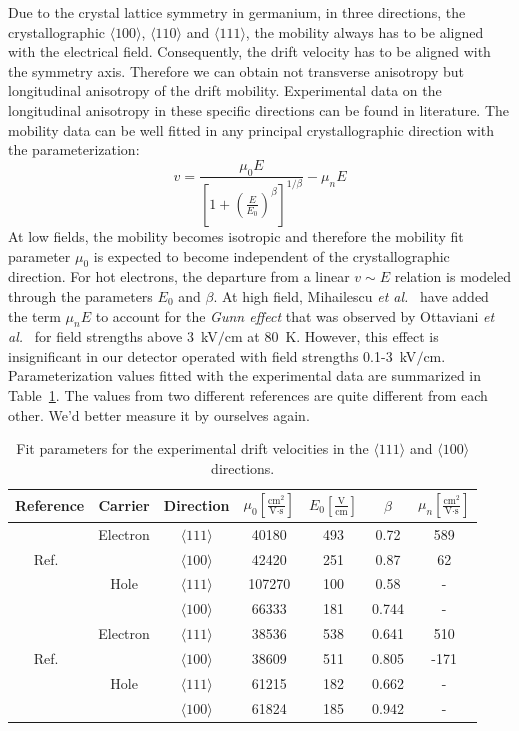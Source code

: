 Due to the crystal lattice symmetry in germanium, in three directions, the crystallographic $\langle100\rangle$, $\langle110\rangle$ and $\langle111\rangle$, the mobility always has to be aligned with the electrical field. Consequently, the drift velocity has to be aligned with the symmetry axis. Therefore we can obtain not transverse anisotropy but longitudinal anisotropy of the drift mobility. Experimental data on the longitudinal anisotropy in these specific directions can be found in literature. The mobility data can be well fitted in any principal crystallographic direction with the parameterization:
\begin{equation}
  \label{eq:para}
  v = \frac{\mu_{0}E}{[1+(\frac{E}{E_{0}})^{\beta}]^{1/\beta}} -   \mu_{n}E
\end{equation}
At low fields, the mobility becomes isotropic and therefore the mobility fit parameter $\mu_{0}$ is expected to become independent of the crystallographic direction. For hot electrons, the departure from a linear $v \sim E$ relation is modeled through the parameters $E_{0}$ and $\beta$. At high field, Mihailescu \textit{et al.}~\cite{miha} have added the term $\mu_{n}E$ to account for the \emph{Gunn effect} that was observed by Ottaviani \textit{et al.}~\cite{otta} for field strengths above 3~kV$/$cm at 80~K. However, this effect is insignificant in our detector operated with field strengths 0.1-3~kV$/$cm. Parameterization values fitted with the experimental data are summarized in Table~\ref{tab:pars}. The values from two different references are quite different from each other. We'd better measure it by ourselves again.

\begin{table}[tbhp]
  \centering
  \begin{tabular}{ccccccc}\hline\hline
     Reference & Carrier & Direction & $\mu_{0} \left[ \frac{\mbox{cm}^{2}}{\mbox{V}\cdot\mbox{s}} \right]$ & $E_{0} \left[ \frac{\mbox{V}}{\mbox{cm}} \right]$ & $\beta$ & $\mu_{n} \left[ \frac{\mbox{cm}^{2}}{\mbox{V}\cdot\mbox{s}} \right]$ \\\hline
& Electron & $\langle111\rangle$ & 40180 & 493 & 0.72 & 589 \\
Ref.~\cite{miha}& & $\langle100\rangle$ & 42420 & 251 & 0.87 & 62\\
& Hole & $\langle111\rangle$ & 107270 & 100 & 0.58 & - \\
& & $\langle100\rangle$ & 66333 & 181 & 0.744 & - \\\hline\hline
& Electron & $\langle111\rangle$ & 38536 & 538 & 0.641 & 510 \\
Ref.~\cite{bart}& & $\langle100\rangle$ & 38609 & 511 & 0.805 & -171\\ 
& Hole & $\langle111\rangle$ & 61215 & 182 & 0.662 & - \\
& & $\langle100\rangle$ & 61824 & 185 & 0.942 & - \\\hline\hline
  \end{tabular}
  \caption{Fit parameters for the experimental drift velocities in the 
$\langle111\rangle$ and $\langle100\rangle$ directions.}
\label{tab:pars}
\end{table}

